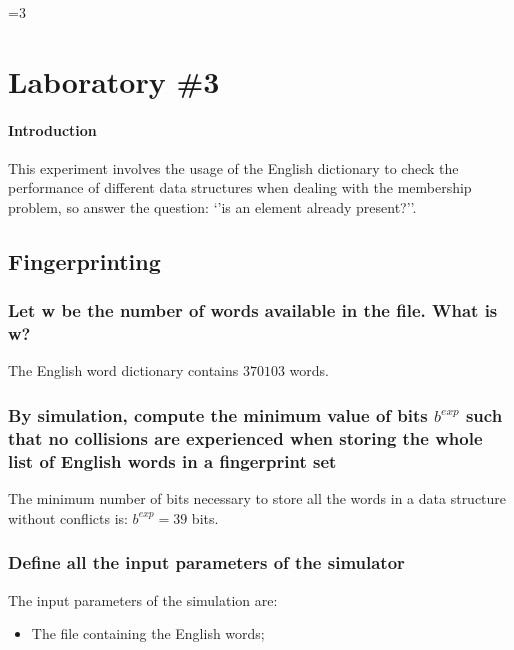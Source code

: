 \documentclass[twocolumn,letterpaper]{report}
\newcounter{debug}
\begin{document}
			
			
\ifnum\value{debug}=3 {

\chapter{Laboratory \#3}
	 \subsubsection{Introduction}
				This experiment involves the usage of the English dictionary to check the performance of different data structures when dealing with the membership problem, so answer the question: `'is an element already present?''. 
	 
	 \section{Fingerprinting}	 
	 
			 	\subsection{Let w be the number of words available in the file. What is w?}
								The English word dictionary contains $370103$ words.
								
			 	\subsection{By simulation, compute the minimum value of bits $b^{exp}$ such that no collisions are experienced when storing the whole list of English words in a fingerprint set}
						The minimum number of bits necessary to store all the words in a data structure without conflicts is: $b^{exp} = 39$ bits.
						
				\subsection{Define all the input parameters of the simulator}
					The input parameters of the simulation are:
					\begin{itemize}
						\item The file containing the English words;
					\end{itemize}
					 
}
\end{document}
